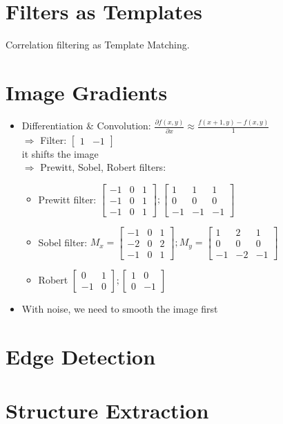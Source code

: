 \section{Filters as Templates}
Correlation filtering as Template Matching.

\section{Image Gradients}
\begin{itemize}
	\item Differentiation \& Convolution: $\displaystyle \frac{\partial f(x,y)}{\partial x} \approx \frac{f(x+1,y) - f(x,y)}{1}$\\
	$\Rightarrow$ Filter: $\begin{bmatrix}
		1 & -1
	\end{bmatrix}$\\
	 it shifts the image \\
	$\Rightarrow$ Prewitt, Sobel, Robert filters:
	\begin{itemize}
		\item Prewitt filter: $\begin{bmatrix}
			-1 & 0 & 1\\
			-1 & 0 & 1\\
			-1 & 0 & 1
		\end{bmatrix}; \begin{bmatrix}
			1 & 1 & 1\\
			0 & 0 & 0\\
			-1 & -1 & -1
		\end{bmatrix}$
		\item Sobel filter: $M_x=\begin{bmatrix}
			-1 & 0 & 1\\
			-2 & 0 & 2\\
			-1 & 0 & 1
		\end{bmatrix}; M_y=\begin{bmatrix}
			1 & 2 & 1\\
			0 & 0 & 0\\
			-1 & -2 & -1
		\end{bmatrix}$
		\item Robert $\begin{bmatrix}
			0 & 1\\
			-1 & 0
		\end{bmatrix}; \begin{bmatrix}
		1 & 0\\
		0 & -1
	\end{bmatrix}$
	\end{itemize}
	\item With noise, we need to smooth the image first
\end{itemize}

\section{Edge Detection}


\section{Structure Extraction}

